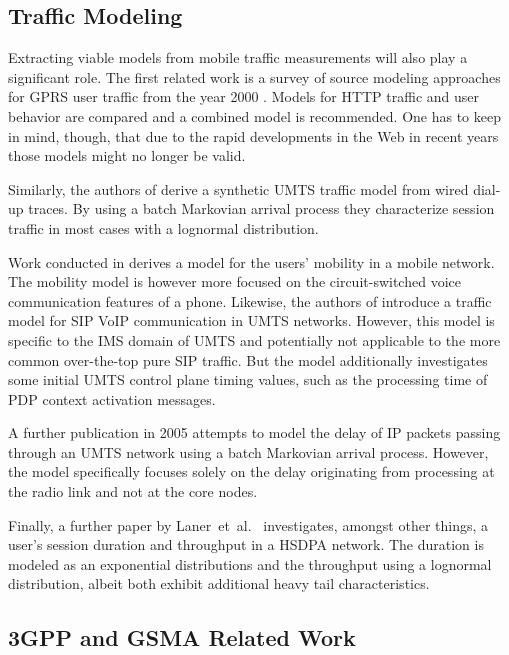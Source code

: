 \subsection{Traffic Modeling}

Extracting viable models from mobile traffic measurements will also play a significant role. The first related work is a survey of source modeling approaches for \gls{GPRS} user traffic from the year 2000 \cite{staehle2000source}. Models for \gls{HTTP} traffic and user behavior are compared and a combined model is recommended. One has to keep in mind, though, that due to the rapid developments in the Web in recent years those models might no longer be valid. 

Similarly, the authors of \cite{965876} derive a synthetic \gls{UMTS} traffic model from wired dial-up traces. By using a batch Markovian arrival process they characterize session traffic in most cases with a lognormal distribution.

Work conducted in \cite{Halepovic:2005:CMU:1089803.1089969} derives a model for the users' mobility in a mobile network. The mobility model is however more focused on the circuit-switched voice communication features of a phone. Likewise, the authors of \cite{Pesch2005385} introduce a traffic model for \gls{SIP} \gls{VoIP} communication in \gls{UMTS} networks. However, this model is specific to the \gls{IMS} domain of \gls{UMTS} and potentially not applicable to the more common over-the-top pure \gls{SIP} traffic. But the model additionally investigates some initial \gls{UMTS} control plane timing values, such as the processing time of \gls{PDP} context activation messages.

A further publication in 2005 \cite{Landman200568} attempts to model the delay of \gls{IP} packets passing through an \gls{UMTS} network using a batch Markovian arrival process. However, the model specifically focuses solely on the delay originating from processing at the radio link and not at the core nodes.

Finally, a further paper by Laner~et~al.~\cite{6214330} investigates, amongst other things, a user's session duration and throughput in a \gls{HSDPA} network. The duration is modeled as an exponential distributions and the throughput using a lognormal distribution, albeit both exhibit additional heavy tail characteristics.


\subsection{\texorpdfstring{\acrshort{3GPP}}{3GPP} and \texorpdfstring{\acrshort{GSMA}}{GSMA} Related Work}


